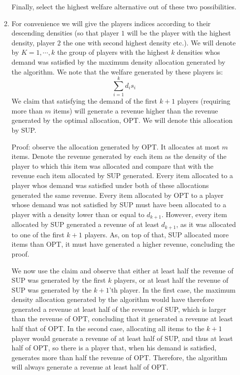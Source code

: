 \documentclass[a4page,notitlepage]{article}
\begin{document}
\begin{enumerate}
\begin{enumerate}
    Finally, select the highest welfare alternative out of
    these two possibilities.
    \item
      For convenience we will give the players indices according to their descending densities (so that player $1$ will be the player with the highest density, player $2$ the one with second highest density etc.).
      We will denote by $K={1,\cdots,k}$ the group of players with the highest $k$ densities whos demand was satisfied by the maximum density allocation generated by the algorithm.
      We note that the welfare generated by these players is:
      \begin{equation*}
        \sum_{i=1}^kd_is_i
      \end{equation*}
      We claim that satisfying the demand of the first $k+1$ players (requiring more than $m$ items) will generate a revenue higher than the revenue generated by the optimal allocation, OPT.
      We will denote this allocation by SUP.

      Proof: observe the allocation generated by OPT.
      It allocates at most $m$ items.
      Denote the revenue generated by each item as the density of the player to which this item was allocated and compare that with the revenue each item allocated by SUP generated.
      Every item allocated to a player whos demand was satisfied under both of these allocations generated the same revenue.
      Every item allocated by OPT to a player whose demand was not satisfied by SUP must have been allocated to a player with a density lower than or equal to $d_{k+1}$.
      However, every item allocated by SUP generated a revenue of at least $d_{k+1}$, as it was allocated to one of the first $k+1$ players.
      As, on top of that, SUP allocated more items than OPT, it must have generated a higher revenue, concluding the proof.
      
      We now use the claim and observe that either at least half the revenue of SUP was generated by the first $k$ players, or at least half the revenue of SUP was generated by the $k+1$'th player.
      In the first case, the maximum density allocation generated by the algorithm would have therefore generated a revenue at least half of the revenue of SUP, which is larger than the revenue of OPT, concluding that it generated a revenue at least half that of OPT.
      In the second case, allocating all items to the $k+1$ player would generate a revenue of at least half of SUP, and thus at least half of OPT, so there is a player that, when his demand is satisfied, generates more than half the revenue of OPT.
      Therefore, the algorithm will always generate a revenue at least half of OPT.


\end{enumerate}
\end{enumerate}
\end{document}
